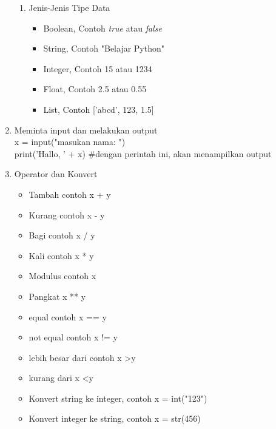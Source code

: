\begin{enumerate}
\begin{enumerate}
\item Jenis-Jenis Tipe Data\\
\begin{itemize}
\item Boolean, Contoh \textit{true} atau \textit{false}
\item String, Contoh "Belajar Python"
\item Integer, Contoh 15 atau 1234
\item Float, Contoh 2.5 atau 0.55
\item List, Contoh ['abcd', 123, 1.5]
\end{itemize}
\end{enumerate}

\item Meminta input dan melakukan output\\
x = input("masukan nama: ")\\
print('Hallo, ' + x) \#dengan perintah ini, akan menampilkan output\\

\item Operator dan Konvert
\begin{itemize}
\item Tambah contoh x + y
\item Kurang contoh x - y
\item Bagi contoh x / y
\item Kali contoh x * y
\item Modulus contoh x %
\item Pangkat x ** y
\item equal contoh x == y
\item not equal contoh x != y
\item lebih besar dari contoh x \textgreater  y
\item kurang dari x \textless y
\item Konvert string ke integer, contoh x = int("123")
\item Konvert integer ke string, contoh x = str(456)
\end{itemize}


\end{enumerate}
